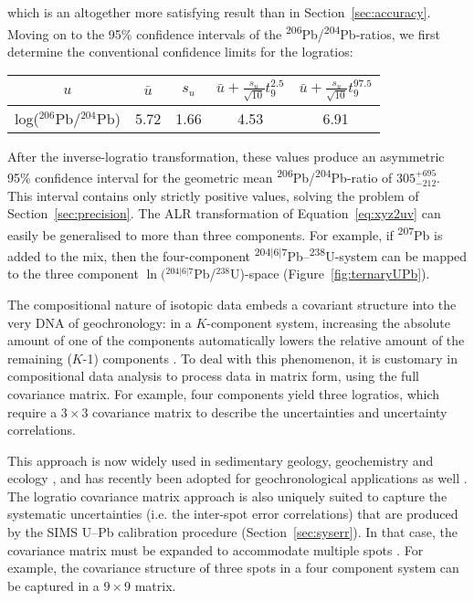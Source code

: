 \documentclass{article}
\begin{document}
\noindent which is an altogether more satisfying result than in
Section~\ref{sec:accuracy}. Moving on to the 95\% confidence intervals
of the \textsuperscript{206}Pb/\textsuperscript{204}Pb-ratios, we
first determine the conventional confidence limits for the logratios:

\begin{center}
\begin{tabular}{ccccc}
  $u$ & $\bar{u}$ & $s_u$ &
  $\bar{u}+\frac{s_u}{\sqrt{10}}t^{2.5}_{9}$ &
  $\bar{u}+\frac{s_u}{\sqrt{10}}t^{97.5}_{9}$ \\ \hline
  log($^{206}$Pb/$^{204}$Pb) & 5.72 & 1.66 & 4.53 & 6.91 \\
\end{tabular}
\end{center}

After the inverse-logratio transformation, these values produce an
asymmetric 95\% confidence interval for the geometric mean
\textsuperscript{206}Pb/\textsuperscript{204}Pb-ratio of
$305^{+695}_{-212}$. This interval contains only strictly positive
values, solving the problem of Section~\ref{sec:precision}. The ALR
transformation of Equation~\ref{eq:xyz2uv} can easily be generalised
to more than three components. For example, if \textsuperscript{207}Pb
is added to the mix, then the four-component
\textsuperscript{$204|6|7$}Pb--\textsuperscript{238}U-system can be
mapped to the three component $\ln({}^{204|6|7}$Pb/${}^{238}$U)-space
(Figure~\ref{fig:ternaryUPb}).\medskip

The compositional nature of isotopic data embeds a covariant structure
into the very DNA of geochronology: in a $K$-component system,
increasing the absolute amount of one of the components automatically
lowers the relative amount of the remaining ($K$-1) components
\citep{chayes1960}. To deal with this phenomenon, it is customary in
compositional data analysis to process data in matrix form, using the
full covariance matrix. For example, four components yield three
logratios, which require a ${3}\times{3}$ covariance matrix to
describe the uncertainties and uncertainty correlations.\medskip

This approach is now widely used in sedimentary geology, geochemistry
and ecology \citep[e.g.,][]{weltje2002, vermeesch2006b,
  pawlowsky2011}, and has recently been adopted for geochronological
applications as well \citep{vermeesch2010a, vermeesch2015b,
  mclean2016}. The logratio covariance matrix approach is also
uniquely suited to capture the systematic uncertainties (i.e. the
inter-spot error correlations) that are produced by the SIMS U--Pb
calibration procedure (Section~\ref{sec:syserr}). In that case, the
covariance matrix must be expanded to accommodate multiple spots
\citep[e.g.,][]{vermeesch2015b}. For example, the covariance structure
of three spots in a four component system can be captured in a
${9}\times{9}$ matrix.\medskip
\end{document}
